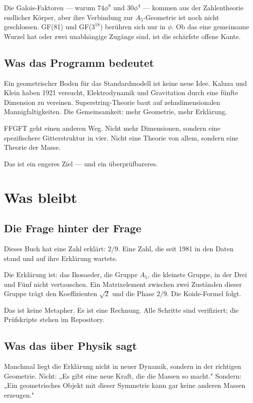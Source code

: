 \documentclass[12pt,oneside]{book}
\begin{document}
Die Galois-Faktoren — warum $74\phi^8$ und $30\phi^4$ — kommen aus der Zahlentheorie endlicher Körper, aber ihre Verbindung zur $A_5$-Geometrie ist noch nicht geschlossen. GF(81) und GF($3^{18}$) berühren sich nur in $\phi$. Ob das eine gemeinsame Wurzel hat oder zwei unabhängige Zugänge sind, ist die schärfste offene Kante.

\section{Was das Programm bedeutet}

Ein geometrischer Boden für das Standardmodell ist keine neue Idee. Kaluza und Klein haben 1921 versucht, Elektrodynamik und Gravitation durch eine fünfte Dimension zu vereinen. Superstring-Theorie baut auf zehndimensionalen Mannigfaltigkeiten. Die Gemeinsamkeit: mehr Geometrie, mehr Erklärung.

FFGFT geht einen anderen Weg. Nicht mehr Dimensionen, sondern eine spezifischere Gitterstruktur in vier. Nicht eine Theorie von allem, sondern eine Theorie der Masse.

Das ist ein engeres Ziel — und ein überprüfbareres.

\chapter{Was bleibt}

\section{Die Frage hinter der Frage}

Dieses Buch hat eine Zahl erklärt: $2/9$. Eine Zahl, die seit 1981 in den Daten stand und auf ihre Erklärung wartete.

Die Erklärung ist: das Ikosaeder, die Gruppe $A_5$, die kleinste Gruppe, in der Drei und Fünf nicht vertauschen. Ein Matrixelement zwischen zwei Zuständen dieser Gruppe trägt den Koeffizienten $\sqrt{2}$ und die Phase $2/9$. Die Koide-Formel folgt.

Das ist keine Metapher. Es ist eine Rechnung. Alle Schritte sind verifiziert; die Prüfskripte stehen im Repository.

\section{Was das über Physik sagt}

Manchmal liegt die Erklärung nicht in neuer Dynamik, sondern in der richtigen Geometrie. Nicht: „Es gibt eine neue Kraft, die die Massen so macht." Sondern: „Ein geometrisches Objekt mit dieser Symmetrie kann gar keine anderen Massen erzeugen."
\end{document}
